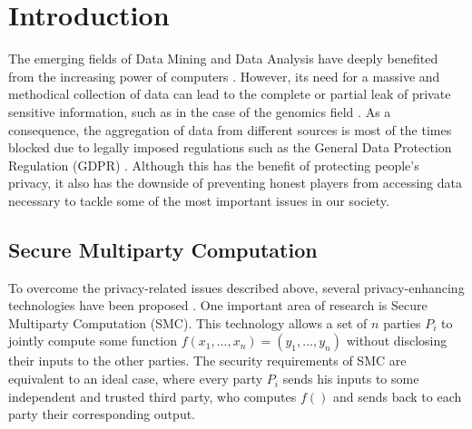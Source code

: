 


%

\chapter{Introduction}

The emerging fields of Data Mining and Data Analysis have deeply benefited from the increasing power of computers \cite{Wang11}. However, its need for a massive and methodical collection of data can lead to the complete or partial leak of private sensitive information, such as in the case of the genomics field \cite{NS08, L02, Homer08, Gymrek13}. As a consequence, the aggregation of data from different sources is most of the times blocked due to legally imposed regulations such as the General Data Protection Regulation (GDPR) \cite{EUdataregulations2016}. Although this has the benefit of protecting people's privacy, it also has the downside of preventing honest players from accessing data necessary to tackle some of the most important issues in our society. 

\section*{Secure Multiparty Computation}


To overcome the privacy-related issues described above, several privacy-enhancing technologies have been proposed \cite{Li2016, Armknecht2015, Yao82}. One important area of research is Secure Multiparty Computation (SMC). This technology allows a set of $n$ parties $P_i$ to jointly compute some function $f( x_1, ..., x_n ) = (y_1, ..., y_n)$ without disclosing their inputs to the other parties. The security requirements of SMC are equivalent to an ideal case, where every party $P_i$ sends his inputs to some independent and trusted third party, who computes $f()$ and sends back to each party their corresponding output.

